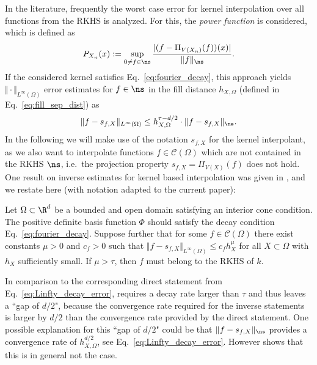 \documentclass[a4paper, 10pt]{article}
\begin{document}
In the literature, frequently the worst case error for kernel interpolation over all functions from the RKHS is analyzed.
For this, the \textit{power function} is considered, which is defined as
\begin{align}
\label{eq:def_powerfunc}
P_{X_n}(x) := \sup_{0 \neq f \in \ns} \frac{|(f - \Pi_{V(X_n)}(f))(x)|}{\Vert f \Vert_{\ns}}.
\end{align}
If the considered kernel satisfies Eq.~\eqref{eq:fourier_decay}, this approach yields $\Vert \cdot \Vert_{L^\infty(\Omega)}$ error estimates for $f \in \ns$ in the fill distance $h_{X, \Omega}$ (defined in Eq.~\eqref{eq:fill_sep_dist}) as
\begin{align}
\label{eq:Linfty_decay_error}
\Vert f - s_{f, X} \Vert_{L^\infty(\Omega)} \leq h_{X, \Omega}^{\tau - d/2} \cdot \Vert f - s_{f, X} \Vert_{\ns}.
\end{align}
%
%
%
%
%
%
%
%
%
In the following we will make use of the notation $s_{f, X}$ for the kernel interpolant, as we also want to interpolate functions $f \in \mathcal{C}(\Omega)$ which are not contained in the RKHS $\ns$, i.e.\ the projection property $s_{f, X} = \Pi_{V(X)}(f)$ does not hold. \\

One result on inverse estimates for kernel based interpolation was given in \cite{schaback2002inverse}, and we restate \cite[Theorem 6.1]{schaback2002inverse} here (with notation adapted to the current paper):
\begin{theorem}
\label{th:inverse_theorem_schaback}
Let $\Omega \subset \R^d$ be a bounded and open domain satisfying an interior cone condition.
The positive definite basis function $\Phi$ should satisfy the decay condition Eq.~\eqref{eq:fourier_decay}.
Suppose further that for some $f \in \mathcal{C}(\Omega)$ there exist constants $\mu > 0$ and $c_f > 0$ such that $\Vert f - s_{f, X} \Vert_{L^\infty(\Omega)} \leq c_f h_X^\mu$ for all $X \subset \Omega$ with $h_X$ sufficiently small.
If $\mu > \tau$, then $f$ must belong to the RKHS of $k$.
\end{theorem}
In comparison to the corresponding direct statement from Eq.~\eqref{eq:Linfty_decay_error},
 requires a decay rate larger than $\tau$ and thus leaves a ``gap of $d/2$", because the convergence rate required for the inverse statements is larger by $d/2$ than the convergence rate provided by the direct statement. 
One possible explanation for this ``gap of $d/2$" could be that $\Vert f - s_{f, X} \Vert_{\ns}$ provides a convergence rate of $h_{X, \Omega}^{d/2}$, see Eq.~\eqref{eq:Linfty_decay_error}.
However \cite[Section 6.2]{wenzel2022analysis} shows that this is in general not the case.
\end{document}
